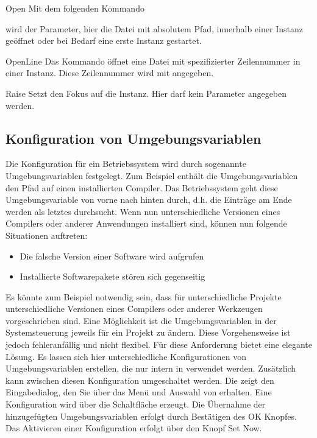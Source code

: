 \begin{codeentry}
\item[Open] Mit dem folgenden Kommando

\begin{code}
\end{code}

wird der Parameter, hier die Datei mit absolutem Pfad, innerhalb einer \codeblocks Instanz geöffnet oder bei Bedarf eine erste Instanz gestartet.
\item[OpenLine] Das Kommando öffnet eine Datei mit spezifizierter Zeilennummer in einer \codeblocks Instanz. Diese Zeilennummer wird mit  angegeben.

\begin{code}
\end{code}

\item[Raise] Setzt den Fokus auf die \codeblocks Instanz. Hier darf kein Parameter angegeben werden.
\end{codeentry}

\subsection{Konfiguration von Umgebungsvariablen}

Die Konfiguration für ein Betriebssystem wird durch sogenannte Umgebungsvariablen festgelegt. Zum Beispiel enthält die Umgebungsvariablen  den Pfad auf einen installierten Compiler. Das Betriebssystem geht diese Umgebungsvariable von vorne nach hinten durch, d.h. die Einträge am Ende werden als letztes durchsucht. Wenn nun unterschiedliche Versionen eines Compilers oder anderer Anwendungen installiert sind, können nun folgende Situationen auftreten:

\begin{itemize}
\item Die falsche Version einer Software wird aufgrufen
\item Installierte Softwarepakete stören sich gegenseitig
\end{itemize}

Es könnte zum Beispiel notwendig sein, dass für unterschiedliche Projekte unterschiedliche Versionen eines Compilers oder anderer Werkzeugen vorgeschrieben sind. Eine Möglichkeit ist die Umgebungsvariablen in der Systemsteuerung jeweils für ein Projekt zu ändern. Diese Vorgehensweise ist jedoch fehleranfällig und nicht flexibel. Für diese Anforderung bietet \codeblocks eine elegante Lösung. Es lassen sich hier unterschiedliche Konfigurationen von Umgebungsvariablen erstellen, die nur intern in \codeblocks verwendet werden. Zusätzlich kann zwischen diesen Konfiguration umgeschaltet werden. Die  zeigt den Eingabedialog, den Sie über das Menü  und Auswahl von  erhalten. Eine Konfiguration wird über die Schaltfläche  erzeugt. Die Übernahme der hinzugefügten Umgebungsvariablen erfolgt durch Bestätigen des OK Knopfes. Das Aktivieren einer Konfiguration erfolgt über den Knopf Set Now.

